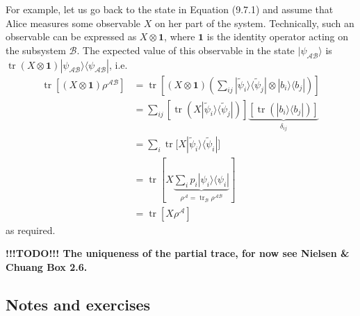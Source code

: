 \documentclass[fleqn]{article}
\begin{document}
For example, let us go back to the state in Equation (9.7.1) and assume that Alice measures some observable \(X\) on her part of the system.
Technically, such an observable can be expressed as \(X\otimes \mathbf{1}\), where \(\mathbf{1}\) is the identity operator acting on the subsystem \(\mathcal{B}\).
The expected value of this observable in the state \(|\psi_{\mathcal{AB}}\rangle\) is \(\operatorname{tr}(X\otimes\mathbf{1})|\psi_{\mathcal{AB}}\rangle\langle\psi_{\mathcal{AB}}|\), i.e.
\[
  \begin{aligned}
    \operatorname{tr}[(X\otimes \mathbf{1}) \rho^{\mathcal{AB}}]
    &= \operatorname{tr}\left[
        (X\otimes\mathbf{1}) \left(
          \sum_{ij} |\widetilde\psi_i\rangle\langle\widetilde\psi_j| \otimes |b_i\rangle\langle b_j|
        \right)
      \right]
  \\&= \sum_{ij} \left[
        \operatorname{tr}\left(X |\widetilde\psi_i\rangle\langle\widetilde\psi_j|\right)
      \right]
      \underbrace{\left[\operatorname{tr}\left(|b_i\rangle\langle b_j|\right)\right]}_{\delta_{ij}}
  \\&= \sum_i \operatorname{tr}\big[X |\widetilde\psi_i\rangle\langle\widetilde\psi_i|\big]
  \\&= \operatorname{tr}\left[
      X \underbrace{\sum_i p_i|\psi_i\rangle\langle\psi_i|}_{\rho^{\mathcal{A}} = \operatorname{tr}_{\mathcal{B}}\rho^{\mathcal{AB}}}
    \right]
  \\&= \operatorname{tr}[X\rho^{\mathcal{A}}]
  \end{aligned}
\]
as required.

\textbf{!!!TODO!!! The uniqueness of the partial trace, for now see Nielsen \& Chuang Box 2.6.}

\hypertarget{notes-and-exercises}{%
\subsection{Notes and exercises}\label{notes-and-exercises}}
\end{document}
